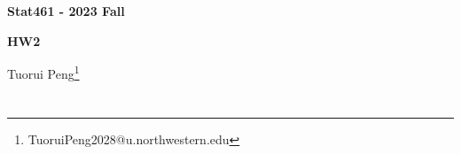 \documentclass[11pt,a4paper]{ctexart}
\numberwithin{equation}{section}%
\begin{document}
\begin{center}\thispagestyle{plain}

{\LARGE\textbf{Stat461 - 2023 Fall}}

{\Large\textbf{HW2}}

Tuorui Peng\footnote{TuoruiPeng2028@u.northwestern.edu}
\end{center}

\thispagestyle{myheadings}
\pagestyle{myheadings}






\section{}

\subsection{}
\end{document}
